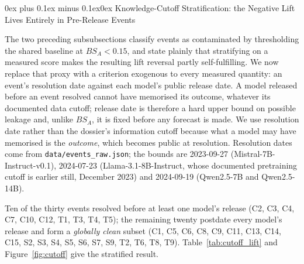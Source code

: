 \documentclass[11pt,journal,onecolumn]{IEEEtran}
\makeatletter
\renewcommand\subsubsection{\@startsection{subsubsection}{3}{\parindent}%
  {0ex plus 0.1ex minus 0.1ex}{0ex}%
  {\normalfont\normalsize\bfseries\itshape}}
\makeatother
\begin{document}
\subsubsection{Knowledge-Cutoff Stratification: the Negative Lift Lives Entirely in Pre-Release Events}
\label{sec:cutoff}

The two preceding subsubsections classify events as contaminated by thresholding the shared baseline at $BS_A < 0.15$, and state plainly that stratifying on a measured score makes the resulting lift reversal partly self-fulfilling. We now replace that proxy with a criterion exogenous to every measured quantity: an event's resolution date against each model's public release date. A model released before an event resolved cannot have memorised its outcome, whatever its documented data cutoff; release date is therefore a hard upper bound on possible leakage and, unlike $BS_A$, it is fixed before any forecast is made. We use resolution date rather than the dossier's information cutoff because what a model may have memorised is the \emph{outcome}, which becomes public at resolution. Resolution dates come from \texttt{data/events\_raw.json}; the bounds are 2023-09-27 (Mistral-7B-Instruct-v0.1), 2024-07-23 (Llama-3.1-8B-Instruct, whose documented pretraining cutoff is earlier still, December 2023) and 2024-09-19 (Qwen2.5-7B and Qwen2.5-14B).

Ten of the thirty events resolved before at least one model's release (C2, C3, C4, C7, C10, C12, T1, T3, T4, T5); the remaining twenty postdate every model's release and form a \emph{globally clean} subset (C1, C5, C6, C8, C9, C11, C13, C14, C15, S2, S3, S4, S5, S6, S7, S9, T2, T6, T8, T9). Table~\ref{tab:cutoff_lift} and Figure~\ref{fig:cutoff} give the stratified result.
\end{document}
